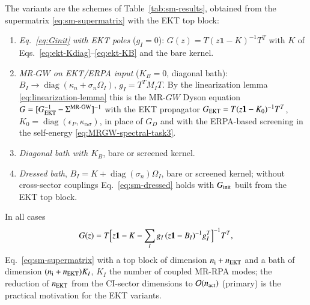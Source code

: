 \documentclass[aip,jcp,reprint,noshowkeys,superscriptaddress]{revtex4-1}
\begin{document}
The variants are the schemes of Table~\ref{tab:sm-results}, obtained from
the supermatrix \eqref{eq:sm-supermatrix} with the EKT top block:
\begin{enumerate}
\item \emph{Eq.~\eqref{eq:Ginit} with EKT poles} ($g_I=0$):
  $G(z)=T(z\mathbf 1-K)^{-1}T^{T}$ with $K$ of
  Eqs.~\eqref{eq:ekt-Kdiag}--\eqref{eq:ekt-KB} and the bare kernel.
\item \emph{MR-$GW$ on EKT/ERPA input} ($K_B=0$, diagonal bath):
  $B_I\to\operatorname{diag}(\kappa_n+\sigma_n\Omega_I)$, $g_I=T^{T}M_IT$.
  By the linearization lemma \eqref{eq:linearization-lemma} this is the
  MR-$GW$ Dyson equation
  $G=[G_{\rm EKT}^{-1}-\Sigma^{\rm MR\text{-}GW}]^{-1}$ with the EKT
  propagator $G_{\rm EKT}=T(z\mathbf 1-K_0)^{-1}T^{T}$,
  $K_0=\operatorname{diag}(\epsilon_P,\kappa_{\alpha\sigma})$, in place of
  $G_D$ and with the ERPA-based screening in the self-energy
  \eqref{eq:MRGW-spectral-task3}.
\item \emph{Diagonal bath with $K_B$}, bare or screened kernel.
\item \emph{Dressed bath}, $B_I=K+\operatorname{diag}(\sigma_n)\Omega_I$,
  bare or screened kernel; without cross-sector couplings
  Eq.~\eqref{eq:sm-dressed} holds with $G_{\rm init}$ built from the EKT
  top block.
\end{enumerate}
In all cases
\begin{equation}
  G(z)=T\Bigl[z\mathbf 1-K-\sum_Ig_I\,(z\mathbf 1-B_I)^{-1}g_I^{T}\Bigr]^{-1}T^{T},
  \label{eq:ekt-G}
\end{equation}
Eq.~\eqref{eq:sm-supermatrix} with a top block of dimension
$n_{\rm i}+n_{\rm EKT}$ and a bath of dimension $(n_{\rm i}+n_{\rm EKT})K_I$,
$K_I$ the number of coupled MR-RPA modes; the reduction of $n_{\rm EKT}$
from the CI-sector dimensions to $\mathcal O(n_{\rm act})$ (primary) is the
practical motivation for the EKT variants.
\end{document}
